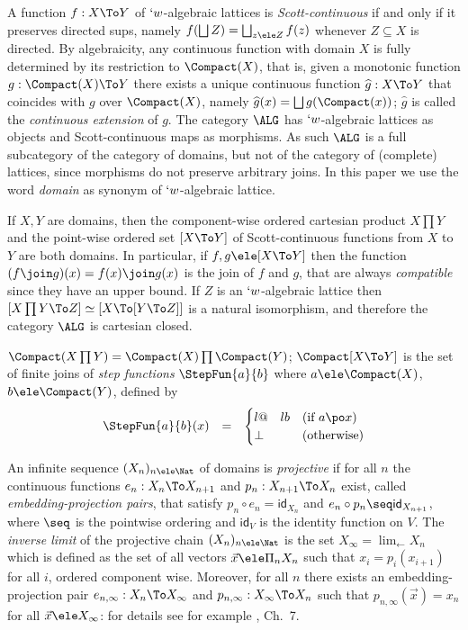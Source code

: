\documentclass{CSML}
\def\ie{\emph{i.e.}}
\newcommand{\vect}[1]{\vec{#1}}
\begin{document}
A function $f:X\To Y$ of $`w$-algebraic lattices is \emph{Scott-continuous} if and only if it preserves directed sups, namely $f(\bigsqcup Z) = \bigsqcup_{z\ele Z}f(z)$ whenever $Z\subseteq X$ is directed. 
By algebraicity, any continuous function with domain $X$ is fully determined by its restriction to $\Compact(X)$, that is, given a monotonic function $g:\Compact(X)\To Y$ there exists a unique continuous function $\widehat{g}:X\To Y$ that coincides with $g$ over $\Compact(X)$, namely $\widehat{g}(x) = \bigsqcup g(\Compact(x))$; $\widehat{g}$ is called the \emph{continuous extension} of $g$.
The category $\ALG$ has $`w$-algebraic lattices as objects and Scott-continuous maps as morphisms. 
As such $\ALG$ is a full subcategory of the category of domains, but not of the category of (complete) lattices, since morphisms do not preserve arbitrary joins. 
In this paper we use the word \emph{domain} as synonym of $`w$-algebraic lattice.

If $X,Y$ are domains, then the component-wise ordered cartesian product $X\prod Y$ and the point-wise ordered set $[X \To Y]$ of Scott-continuous functions from $X$ to $Y$ are both domains.
In particular, if $f,g \ele [X\To Y]$ then the function $(f\join g)(x) = f(x) \join g(x)$ is the join of $f$ and $g$, that are always \emph{compatible} since they have an upper bound.
If $Z$ is an $`w$-algebraic lattice then $[X\prod Y \To Z] \simeq [X \To [Y \To Z]]$ is a natural isomorphism, and therefore the category $\ALG$ is cartesian closed. 

$\Compact(X\prod Y) = \Compact(X)\prod \Compact(Y)$; %
$\Compact[X\To Y]$ is the set of finite joins of \emph{step functions} $\StepFun{a }{ b}$ where $a \ele \Compact(X)$, $b \ele \Compact(Y)$, defined by 
%
 \[ \begin{array}{rcl}
 \StepFun{a }{ b}(x) &=& 
 \begin{cases}{l@{\quad}l} b & (\textrm{if }a \po x) \\
 \bot & (\textrm{otherwise}) 
 \end{cases}
 \end{array} \]

An infinite sequence $(X_n)_{n\ele \Nat}$ of domains is \emph{projective} if for all $n$ the continuous functions $e_n:X_n \To X_{n+1}$ and $p_n:X_{n+1}\To X_n$ exist, called \emph{embedding-projection pairs}, that satisfy $p_n \circ e_n = \textsf{id}_{X_n}$ and $e_n \circ p_n \seq \textsf{id}_{X_{n+1}}$, where $\seq$ is the pointwise ordering and $ \textsf{id}_V $ is the identity function on $V$. 
The \emph{inverse limit} of the projective chain $(X_n)_{n\ele \Nat}$ is the set $X_\infty = \lim_\leftarrow X_n$ which is defined as the set of all vectors $\vect{x} \ele \Pi_n X_n$ such that $x_i = p_i(x_{i+1})$ for all $i$, ordered component wise. 
Moreover, for all $n$ there exists an embedding-projection pair $e_{n,\infty}:X_n\To X_\infty$ and $p_{n,\infty}:X_\infty\To X_n$ such that $p_{n,\infty}(\vect{x}) = x_n$ for all $\vect{x}\ele X_\infty$: for details see for example \cite{Amadio-Curien'98}, Ch.~7. 
\end{document}
